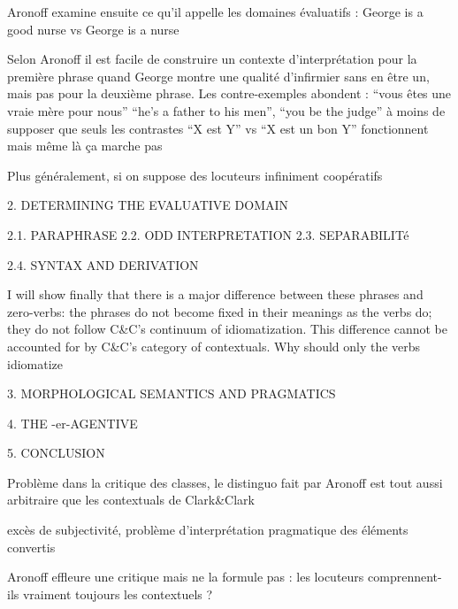 \documentclass[a4paper,12pt]{article}
\begin{document}
   
Aronoff examine ensuite ce qu'il appelle les domaines évaluatifs : 
George is a good nurse vs George is a nurse

Selon Aronoff il est facile de construire un contexte d'interprétation pour la première phrase quand George montre une qualité d'infirmier sans en être
un, mais pas pour la deuxième phrase. Les contre-exemples abondent : 
``vous êtes une vraie mère pour nous'' ``he's a father to his men'', ``you be the judge'' 
à moins de supposer que seuls les contrastes ``X est Y'' vs ``X est un bon Y'' fonctionnent mais même là ça marche pas

Plus généralement, si on suppose des locuteurs infiniment coopératifs 
 
 2. DETERMINING THE EVALUATIVE DOMAIN
 
 2.1. PARAPHRASE
 2.2. ODD INTERPRETATION
 2.3. SEPARABILITé
 
 2.4. SYNTAX AND DERIVATION
 
 I will show finally that there is a major difference between these phrases
and zero-verbs: the phrases do not become fixed in their meanings as the verbs do;
they do not follow C&C's continuum of idiomatization. This difference cannot be
accounted for by C&C's category of contextuals. Why should only the verbs idiomatize

 3. MORPHOLOGICAL SEMANTICS AND PRAGMATICS
 
 4. THE -er-AGENTIVE
 
 5. CONCLUSION
  
 Problème dans la critique des classes, le distinguo fait par Aronoff est tout aussi arbitraire que les contextuals de Clark\&Clark 
 
 excès de subjectivité, problème d'interprétation pragmatique des éléments convertis
 
 Aronoff effleure une critique mais ne la formule pas : les locuteurs comprennent-ils vraiment toujours les contextuels ?
 
  
\end{document}
